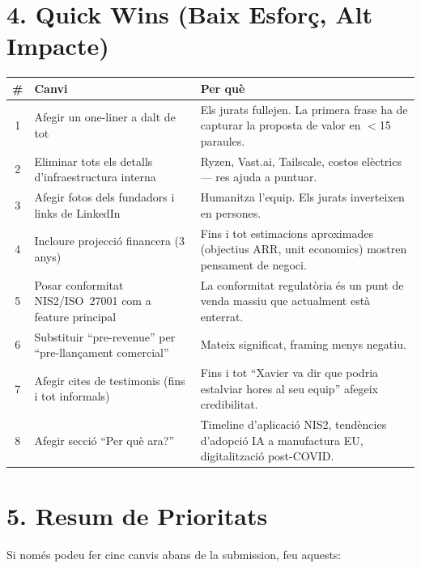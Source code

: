 \documentclass[11pt,a4paper]{article}
\begin{document}
\section{4. Quick Wins (Baix Esforç, Alt Impacte)}

\begin{center}
\small
\renewcommand{\arraystretch}{1.3}
\begin{tabularx}{\textwidth}{c X X}
\toprule
\textbf{\#} & \textbf{Canvi} & \textbf{Per què} \\
\midrule
1 & Afegir un one-liner a dalt de tot & Els jurats fullejen. La primera frase ha de capturar la proposta de valor en $<$15 paraules. \\
2 & Eliminar tots els detalls d'infraestructura interna & Ryzen, Vast.ai, Tailscale, costos elèctrics --- res ajuda a puntuar. \\
3 & Afegir fotos dels fundadors i links de LinkedIn & Humanitza l'equip. Els jurats inverteixen en persones. \\
4 & Incloure projecció financera (3 anys) & Fins i tot estimacions aproximades (objectius ARR, unit economics) mostren pensament de negoci. \\
5 & Posar conformitat NIS2/ISO~27001 com a feature principal & La conformitat regulatòria és un punt de venda massiu que actualment està enterrat. \\
6 & Substituir ``pre-revenue'' per ``pre-llançament comercial'' & Mateix significat, framing menys negatiu. \\
7 & Afegir cites de testimonis (fins i tot informals) & Fins i tot ``Xavier va dir que podria estalviar hores al seu equip'' afegeix credibilitat. \\
8 & Afegir secció ``Per què ara?'' & Timeline d'aplicació NIS2, tendències d'adopció IA a manufactura EU, digitalització post-COVID. \\
\bottomrule
\end{tabularx}
\end{center}

\section{5. Resum de Prioritats}

\noindent Si només podeu fer cinc canvis abans de la submission, feu aquests:
\end{document}

